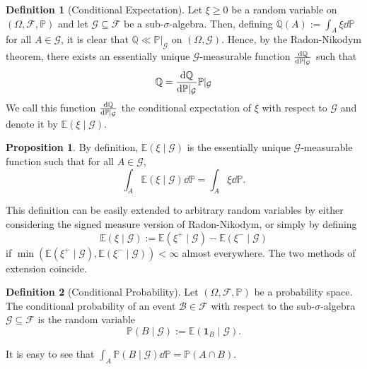\documentclass[]{article}
\theoremstyle{definition}
\theoremstyle{definition}
\newtheorem{definition}{Definition}[section]
\newtheorem{proposition}{Proposition}[section]
\begin{document}
\begin{definition}[Conditional Expectation]
  Let \(\xi \ge 0\) be a random variable on \((\Omega, \mathcal{F}, \mathbb{P})\) 
  and let \(\mathcal{G} \subseteq \mathcal{F}\) be a sub-\(\sigma\)-algebra. 
  Then, defining \(\mathbb{Q}(A) := \int_A \xi \dd \mathbb{P}\) for all 
  \(A \in \mathcal{G}\), it is clear that \(\mathbb{Q} \ll \mathbb{P}|_{\mathcal{G}}\) 
  on \((\Omega, \mathcal{G})\). Hence, by the Radon-Nikodym theorem, there 
  exists an essentially unique \(\mathcal{G}\)-measurable function 
  \(\dv{\mathbb{Q}}{\mathbb{P}|_{\mathcal{G}}}\) such that 
  \[\mathbb{Q} = \dv{\mathbb{Q}}{\mathbb{P}|_{\mathcal{G}}} \mathbb{P}|_{\mathcal{G}}\]
  We call this function \(\dv{\mathbb{Q}}{\mathbb{P}|_{\mathcal{G}}}\) the 
  conditional expectation of \(\xi\) with respect to \(\mathcal{G}\) and 
  denote it by \(\mathbb{E}(\xi \mid \mathcal{G})\).
\end{definition}

\begin{proposition}
  By definition, \(\mathbb{E}(\xi \mid \mathcal{G})\) is the essentially unique 
  \(\mathcal{G}\)-measurable function such that for all \(A \in \mathcal{G}\),
  \[\int_A \mathbb{E}(\xi \mid \mathcal{G})\dd \mathbb{P}
  = \int_A \xi \dd \mathbb{P}.\]
\end{proposition}

This definition can be easily extended to arbitrary random variables by either 
considering the signed measure version of Radon-Nikodym, or simply by defining 
\[\mathbb{E}(\xi \mid \mathcal{G}) := 
  \mathbb{E}(\xi^+ \mid \mathcal{G}) - \mathbb{E}(\xi^- \mid \mathcal{G})\]
if \(\min(\mathbb{E}(\xi^+ \mid \mathcal{G}), \mathbb{E}(\xi^- \mid \mathcal{G})) < \infty\) 
almost everywhere. The two methods of extension coincide. 

\begin{definition}[Conditional Probability]
  Let \((\Omega, \mathcal{F}, \mathbb{P})\) be a probability space. The conditional 
  probability of an event \(\mathcal{B} \in \mathcal{F}\) with respect to the 
  sub-\(\sigma\)-algebra \(\mathcal{G} \subseteq \mathcal{F}\) is the random 
  variable
  \[\mathbb{P}(B \mid \mathcal{G}) := \mathbb{E}(\mathbf{1}_B \mid \mathcal{G}).\]
\end{definition}

It is easy to see that \(\int_A \mathbb{P}(B \mid \mathcal{G}) \dd \mathbb{P} = 
\mathbb{P}(A \cap B)\). 
\end{document}
